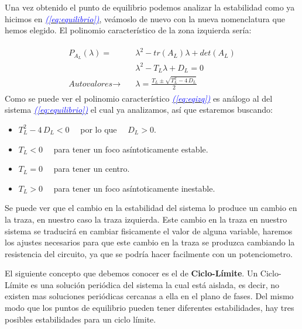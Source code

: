 \documentclass[12pt,a4paper]{report} %
\newcommand{\eref}[1]{\hyperref[#1]{\textcolor{blue}{\textit{(\ref*{#1})}}}}
\begin{document}
		\vspace{0.5cm} Una vez obtenido el punto de equilibrio podemos analizar la estabilidad como ya hicimos en \eref{eq:equilibrio}, veámoslo de nuevo con la nueva nomenclatura que hemos elegido. El polinomio característico de la zona izquierda sería:
		
		\begin{eqnarray}
			\label{eq:eqizq}
			\begin{aligned}
				P_{A_L}(\lambda)=&\lambda^2-tr(A_L)\lambda+det(A_L) \\[1mm]
				&\lambda^2-T_L\lambda+D_L=0 \\[2mm]
				\textit{Autovalores}\rightarrow \quad &\lambda=\frac{T_L\pm \sqrt{T_L^2-4\,D_L}}{2}
			\end{aligned}
		\end{eqnarray}\smallskip
		\newpage
		Como se puede ver el polinomio característico \eref{eq:eqizq} es análogo al del sistema \eref{eq:equilibrio} el cual ya analizamos, así que estaremos buscando:
		
		\begin{itemize}
			\item $T_L^2-4\,D_L<0\quad$ por lo que $\quad D_L>0$.
			\item $T_L<0\quad$ para tener un foco asíntoticamente estable.
			\item $T_L=0\quad$ para tener un centro.
			\item $T_L>0\quad$ para tener un foco asíntoticamente inestable.
		\end{itemize}\smallskip
		
		\vspace{0.5cm}Se puede ver que el cambio en la estabilidad del sistema lo produce un cambio en la traza, en nuestro caso la traza izquierda. Este cambio en la traza en nuestro sistema se traducirá en cambiar fisicamente el valor de alguna variable, haremos los ajustes necesarios para que este cambio en la traza se produzca cambiando la resistencia del circuito, ya que se podría hacer facilmente con un potenciometro.
		
		\vspace{0.5cm}El siguiente concepto que debemos conocer es el de \textbf{Ciclo-Límite}. Un Ciclo-Límite es una solución periódica del sistema la cual está aislada, es decir, no existen mas soluciones periódicas cercanas a ella en el plano de fases. Del mismo modo que los puntos de equilibrio pueden tener diferentes estabilidades, hay tres posibles estabilidades para un ciclo límite.\\[0.5cm]
		
\end{document}

